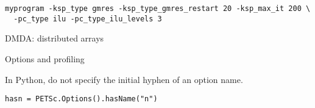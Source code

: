 \begin{verbatim}
myprogram -ksp_type gmres -ksp_type_gmres_restart 20 -ksp_max_it 200 \
  -pc_type ilu -pc_type_ilu_levels 3
\end{verbatim}

 {DMDA: distributed arrays}


 {Options and profiling}
\label{sec:petsc-options}

\begin{pythonnote}
  In Python, do not specify the initial hyphen of an option name.
\begin{verbatim}
hasn = PETSc.Options().hasName("n")
\end{verbatim}
\end{pythonnote}

